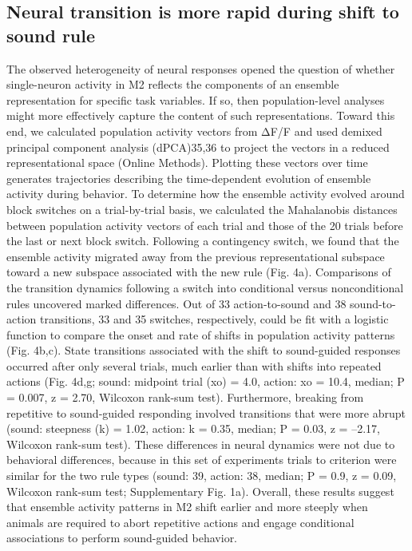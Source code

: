 \subsection{Neural transition is more rapid during shift to sound rule}
The observed heterogeneity of neural responses opened the question of whether single-neuron activity in M2 reflects the components of an ensemble representation for specific task variables. If so, then population-level analyses might more effectively capture the content of such representations. Toward this end, we calculated population activity vectors from ΔF/F and used demixed principal component analysis (dPCA)35,36 to project the vectors in a reduced representational space (Online Methods). Plotting these vectors over time generates trajectories describing the time-dependent evolution of ensemble activity during behavior. To determine how the ensemble activity evolved around block switches on a trial-by-trial basis, we calculated the Mahalanobis distances between population activity vectors of each trial and those of the 20 trials before the last or next block switch. Following a contingency switch, we found that the ensemble activity migrated away from the previous representational subspace toward a new subspace associated with the new rule (Fig. 4a). Comparisons of the transition dynamics following a switch into conditional versus nonconditional rules uncovered marked differences. Out of 33 action-to-sound and 38 sound-to-action transitions, 33 and 35 switches, respectively, could be fit with a logistic function to compare the onset and rate of shifts in population activity patterns (Fig. 4b,c). State transitions associated with the shift to sound-guided responses occurred after only several trials, much earlier than with shifts into repeated actions (Fig. 4d,g; sound: midpoint trial (xo) = 4.0, action: xo = 10.4, median; P = 0.007, z = 2.70, Wilcoxon rank-sum test). Furthermore, breaking from repetitive to sound-guided responding involved transitions that were more abrupt (sound: steepness (k) = 1.02, action: k = 0.35, median; P = 0.03, z = –2.17, Wilcoxon rank-sum test). These differences in neural dynamics were not due to behavioral differences, because in this set of experiments trials to criterion were similar for the two rule types (sound: 39, action: 38, median; P = 0.9, z = 0.09, Wilcoxon rank-sum test; Supplementary Fig. 1a). Overall, these results suggest that ensemble activity patterns in M2 shift earlier and more steeply when animals are required to abort repetitive actions and engage conditional associations to perform sound-guided behavior.


